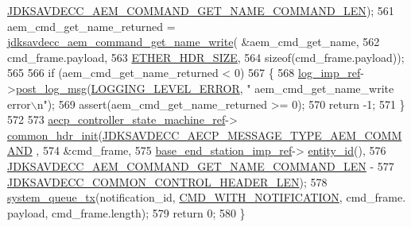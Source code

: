 \begin{DoxyCode}
      \hyperlink{group__command__get__name_ga12d8b1a1daf6c9b805a6d84f5ecf92cb}{JDKSAVDECC\_AEM\_COMMAND\_GET\_NAME\_COMMAND\_LEN});
561     aem\_cmd\_get\_name\_returned = \hyperlink{group__command__get__name_ga61f178bb903a33dc13e23c5e55e2d89d}{jdksavdecc\_aem\_command\_get\_name\_write}(
      &aem\_cmd\_get\_name,
562                                                                       cmd\_frame.payload,
563                                                                       
      \hyperlink{namespaceavdecc__lib_a6c827b1a0d973e18119c5e3da518e65ca9512ad9b34302ba7048d88197e0a2dc0}{ETHER\_HDR\_SIZE},
564                                                                       \textcolor{keyword}{sizeof}(cmd\_frame.payload));
565 
566     \textcolor{keywordflow}{if} (aem\_cmd\_get\_name\_returned < 0)
567     \{
568         \hyperlink{namespaceavdecc__lib_acbe3e2a96ae6524943ca532c87a28529}{log\_imp\_ref}->\hyperlink{classavdecc__lib_1_1log_a68139a6297697e4ccebf36ccfd02e44a}{post\_log\_msg}(\hyperlink{namespaceavdecc__lib_a501055c431e6872ef46f252ad13f85cdaf2c4481208273451a6f5c7bb9770ec8a}{LOGGING\_LEVEL\_ERROR}, \textcolor{stringliteral}{"
      aem\_cmd\_get\_name\_write error\(\backslash\)n"});
569         assert(aem\_cmd\_get\_name\_returned >= 0);
570         \textcolor{keywordflow}{return} -1;
571     \}
572 
573     \hyperlink{namespaceavdecc__lib_a0b1b5aea3c0490f77cbfd9178af5be22}{aecp\_controller\_state\_machine\_ref}->
      \hyperlink{classavdecc__lib_1_1aecp__controller__state__machine_aafc737d7ed17a62fed9df6528f18d3ec}{common\_hdr\_init}(\hyperlink{group__aecp__message__type_ga4625ce189cc209f42deb0629f48faf69}{JDKSAVDECC\_AECP\_MESSAGE\_TYPE\_AEM\_COMMAND}
      ,
574                                                        &cmd\_frame,
575                                                        \hyperlink{classavdecc__lib_1_1descriptor__base__imp_a550c969411f5f3b69f55cc139763d224}{base\_end\_station\_imp\_ref}->
      \hyperlink{classavdecc__lib_1_1end__station__imp_a363b6c9664a0d701def9b17863e20ad3}{entity\_id}(),
576                                                        
      \hyperlink{group__command__get__name_ga12d8b1a1daf6c9b805a6d84f5ecf92cb}{JDKSAVDECC\_AEM\_COMMAND\_GET\_NAME\_COMMAND\_LEN} -
577                                                            
      \hyperlink{group__jdksavdecc__avtp__common__control__header_gaae84052886fb1bb42f3bc5f85b741dff}{JDKSAVDECC\_COMMON\_CONTROL\_HEADER\_LEN});
578     \hyperlink{namespaceavdecc__lib_a6dd511685627c0865a3442b539a4e8e9}{system\_queue\_tx}(notification\_id, \hyperlink{namespaceavdecc__lib_aabcadff06aa62be0ce47bc0646823604aba48b8a017e06fb240b650cdea965178}{CMD\_WITH\_NOTIFICATION}, cmd\_frame.
      payload, cmd\_frame.length);
579     \textcolor{keywordflow}{return} 0;
580 \}
\end{DoxyCode}


